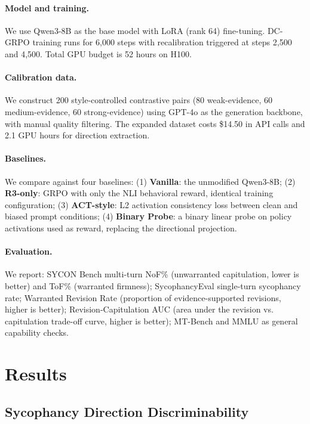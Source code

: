 \documentclass[11pt,a4paper]{article}
\begin{document}
\paragraph{Model and training.} We use Qwen3-8B as the base model with LoRA (rank 64) fine-tuning. DC-GRPO training runs for 6,000 steps with recalibration triggered at steps 2,500 and 4,500. Total GPU budget is 52 hours on H100.

\paragraph{Calibration data.} We construct 200 style-controlled contrastive pairs (80 weak-evidence, 60 medium-evidence, 60 strong-evidence) using GPT-4o as the generation backbone, with manual quality filtering. The expanded dataset costs \$14.50 in API calls and 2.1 GPU hours for direction extraction.

\paragraph{Baselines.} We compare against four baselines: (1) \textbf{Vanilla}: the unmodified Qwen3-8B; (2) \textbf{R3-only}: GRPO with only the NLI behavioral reward, identical training configuration; (3) \textbf{ACT-style}: L2 activation consistency loss between clean and biased prompt conditions; (4) \textbf{Binary Probe}: a binary linear probe on policy activations used as reward, replacing the directional projection.

\paragraph{Evaluation.} We report: SYCON Bench multi-turn NoF\% (unwarranted capitulation, lower is better) and ToF\% (warranted firmness); SycophancyEval single-turn sycophancy rate; Warranted Revision Rate (proportion of evidence-supported revisions, higher is better); Revision-Capitulation AUC (area under the revision vs. capitulation trade-off curve, higher is better); MT-Bench and MMLU as general capability checks.

\section{Results}

\subsection{Sycophancy Direction Discriminability}
\label{sec:calibration}
\end{document}
